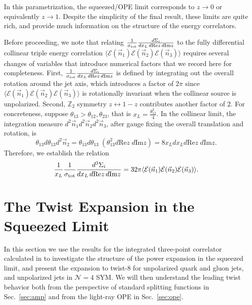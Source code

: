 \documentclass[letterpaper,11pt]{article}
\def\beq{\begin{equation}}
\def\eeq{\end{equation}}
\DeclareRobustCommand{\Sec}[1]{Sec.~\ref{#1}}
\newcommand{\ang}[1]{\langle #1 \rangle}
\def\beq{\begin{equation}}
\def\eeq{\end{equation}}
\begin{document}
In this parametrization, the squeezed/OPE limit corresponds to $z\to 0$ or equivalently $z\to 1$. Despite the simplicity of the final result, these limits are quite rich, and provide much information on the structure of the energy correlators. 


Before proceeding, we note that relating $\frac{1}{\sigma_{\rm tot}}\frac{d\Sigma_{i}}{dx_L \, d \mathrm{Re}{z}\, d\mathrm{Im}{z}}$ to the fully differential collinear triple energy correlation $\ang{\mathcal{E}(\vec{n}_1)\mathcal{E}(\vec{n}_2)\mathcal{E}(\vec{n}_3)}$ requires several changes of variables that introduce numerical factors that we record here for completeness. First, $\frac{1}{\sigma_{\rm tot}}\frac{d\Sigma_{i}}{dx_L \, d \mathrm{Re}{z}\, d\mathrm{Im}{z}}$ is defined by integrating out the overall rotation around the jet axis, which introduces a factor of $2\pi$ since $\ang{\mathcal{E}(\vec{n}_1)\mathcal{E}(\vec{n}_2)\mathcal{E}(\vec{n}_3)}$ is rotationally invariant when the collinear source is unpolarized. Second, $\mathbb{Z}_2$ symmetry $z\leftrightarrow 1-z$ contributes another factor of $2$. For concreteness, suppose $\theta_{13}>\theta_{12},\theta_{23}$, that is $\displaystyle{x_L=\frac{\theta_{13}^2}{4}}$. In the collinear limit, the integration measure $\displaystyle{ d^2\vec{n}_1d^2\vec{n}_2 d^2\vec{n}_3}$, after gauge fixing the overall translation and rotation, is
\beq
\theta_{13} d\theta_{13} d^2\vec{n}_2 =\theta_{13} d\theta_{13}\; (\theta_{13}^2 d\mathrm{Re} z\; d\mathrm{Im} z)=8 x_L dx_L d\mathrm{Re} z\; d\mathrm{Im} z.
\eeq
Therefore, we establish the relation 
\beq \label{eq: conversion_relation}
\frac{1}{x_L}\frac{1}{\sigma_{\rm tot}}\frac{d^3\Sigma_{i}}{dx_L \, d \mathrm{Re}{z}\, d\mathrm{Im}{z}}=32\pi \ang{\mathcal{E}(\vec{n}_1)\mathcal{E}(\vec{n}_2)\mathcal{E}(\vec{n}_3)}.
\eeq



\section{The Twist Expansion in the Squeezed Limit}\label{sec:power_expansion}



In this section we use the results for the integrated three-point correlator calculated in \cite{Chen:2019bpb} to investigate the structure of the power expansion in the squeezed limit, and present the expansion to twist-8 for unpolarized quark and gluon jets, and unpolarized jets in $\mathcal{N}=4$ SYM. We will then understand the leading twist behavior both from the perspective of standard splitting functions in \Sec{sec:amp} and from the light-ray OPE in \Sec{sec:ope}.
\end{document}
